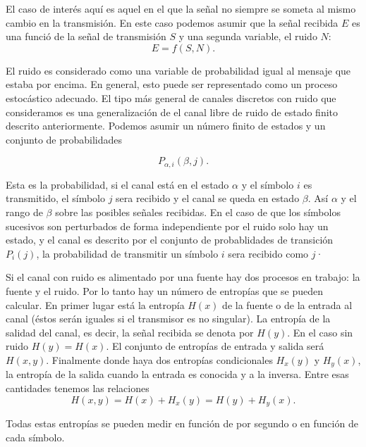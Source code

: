 El caso de inter\'{e}s aqu\'{i} es aquel en el que la se\~{n}al no
siempre se someta al mismo cambio en la transmisi\'{o}n. En este caso
podemos asumir que la se\~{n}al recibida $E$ es una funci\'{o} de la
se\~{n}al de transmisi\'{o}n $S$ y una segunda variable, el ruido $N$:
\begin{equation}
E = f(S, N).
\end{equation}

El ruido es considerado como una variable de probabilidad igual al
mensaje que estaba por encima. En general, esto puede ser representado
como un proceso estoc\'{a}stico adecuado. El tipo m\'{a}s general de
canales discretos con ruido que consideramos es una generalizaci\'{o}n
de el canal libre de ruido de estado finito descrito
anteriormente. Podemos asumir un n\'{u}mero finito de estados y un
conjunto de probabilidades

\begin{equation}
P_{\alpha, i}(\beta , j).
\end{equation}

Esta es la probabilidad, si el canal est\'{a} en el estado $\alpha$ y
el s\'{i}mbolo $i$ es transmitido, el s\'{i}mbolo $j$ sera recibido y
el canal se queda en estado $\beta$. As\'{i} $\alpha$ y el rango de
$\beta$ sobre las posibles se\~{n}ales recibidas. En el caso de que
los s\'{i}mbolos sucesivos son perturbados de forma independiente por
el ruido solo hay un estado, y el canal es descrito por el conjunto de
probablidades de transici\'{o}n $P_{i}(j)$, la
probabilidad de transmitir un s\'{i}mbolo $i$ sera recibido como $j$·

Si el canal con ruido es alimentado por una fuente hay dos procesos en
trabajo: la fuente y el ruido. Por lo tanto hay un n\'{u}mero de
entrop\'{i}as que se pueden calcular. En primer lugar est\'{a} la
entrop\'{i}a $H(x)$ de la fuente o de la entrada al canal (\'{e}stos
ser\'{a}n iguales si el transmisor es no singular). La entrop\'{i}a de
la salidad del canal, es decir, la se\~{n}al recibida se denota por
$H(y)$. En el caso sin ruido $H(y) = H(x)$. El conjunto de
entrop\'{i}as de entrada y salida ser\'{a} $H(x, y)$. Finalmente donde
haya dos entrop\'{i}as condicionales $H_{x}(y)$ y $H_{y}(x)$, la
entrop\'{i}a de la salida cuando la entrada es conocida y a la
inversa. Entre esas cantidades tenemos las relaciones
\begin{equation}
H(x, y) = H(x) + H_{x}(y) = H(y) + H_{y}(x).
\end{equation}

Todas estas entrop\'{i}as se pueden medir en funci\'{o}n de por
segundo o en funci\'{o}n de cada s\'{i}mbolo.

